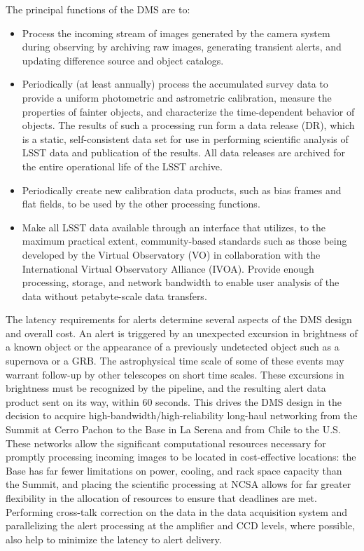 \documentclass[DM,toc,lsstdraft]{lsstdoc}
\begin{document}
The principal functions of the DMS are to:
\begin{itemize}
	\item Process the incoming stream of images generated by the camera system during observing by archiving raw images, generating transient alerts, and updating difference source and object catalogs.
	\item Periodically (at least annually) process the accumulated survey data to provide a uniform photometric and astrometric calibration, measure the properties of fainter objects, and characterize the time-dependent behavior of objects. The results of such a processing run form a data release (DR), which is a static, self-consistent data set for use in performing scientific analysis of LSST data and publication of the results. All data releases are archived for the entire operational life of the LSST archive.
	\item Periodically create new calibration data products, such as bias frames and flat fields, to be used by the other processing functions.
	\item Make all LSST data available through an interface that utilizes, to the maximum practical extent, community-based standards such as those being developed by the Virtual Observatory (VO) in collaboration with the International Virtual Observatory Alliance (IVOA).  Provide enough processing, storage, and network bandwidth to enable user analysis of the data without petabyte-scale data transfers.
\end{itemize}

The latency requirements for alerts determine several aspects of the DMS design
and overall cost.  An alert is triggered by an unexpected excursion in
brightness of a known object or the appearance of a previously undetected
object such as a supernova or a GRB. The astrophysical time scale of some of
these events may warrant follow-up by other telescopes on short time scales.
These excursions in brightness must be recognized by the pipeline, and the
resulting alert data product sent on its way, within 60 seconds. This drives
the DMS design in the decision to acquire high-bandwidth/high-reliability
long-haul networking from the Summit at Cerro Pachon to the Base in La Serena and from Chile to the U.S. These networks allow the significant computational
resources necessary for promptly processing incoming images to be located in
cost-effective locations: the Base has far fewer limitations on power, cooling,
and rack space capacity than the Summit, and placing the scientific
processing at NCSA allows for far greater flexibility in the allocation of
resources to ensure that deadlines are met. Performing cross-talk correction
on the data in the data acquisition system and parallelizing the alert
processing at the amplifier and CCD levels, where possible, also help to
minimize the latency to alert delivery.
\end{document}
